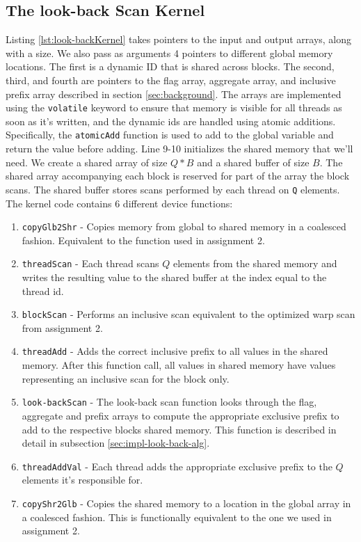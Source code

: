 \documentclass[twocolumn]{article}
\begin{document}
\subsection{The look-back Scan Kernel}
\label{sec:impl-look-back-kernel}
Listing \ref{lst:look-backKernel} takes pointers to the input and output arrays, along with a size. We also pass as arguments 4 pointers to different global memory locations. The first is a dynamic ID that is shared across blocks. The second, third, and fourth are pointers to the flag array, aggregate array, and inclusive prefix array described in section \ref{sec:background}. The arrays are implemented using the \verb|volatile| keyword to ensure that memory is visible for all threads as soon as it's written, and the dynamic ids are handled using atomic additions. Specifically, the \verb|atomicAdd| function is used to add to the global variable and return the value before adding. Line 9-10 initializes the shared memory that we'll need. We create a shared array of size $Q * B$ and a shared buffer of size $B$. The shared array accompanying each block is reserved for part of the array the block scans. The shared buffer stores scans performed by each thread on \verb|Q| elements. The kernel code contains 6 different device functions:
\begin{enumerate}[leftmargin=*]
    \itemsep0em
    \item \verb|copyGlb2Shr| - Copies memory from global to shared memory in a coalesced fashion. Equivalent to the function used in assignment 2.
    \item \verb|threadScan| - Each thread scans $Q$ elements from the shared memory and writes the resulting value to the shared buffer at the index equal to the thread id.
    \item \verb|blockScan| - Performs an inclusive scan equivalent to the optimized warp scan from assignment 2.
    \item \verb|threadAdd| - Adds the correct inclusive prefix to all values in the shared memory. After this function call, all values in shared memory have values representing an inclusive scan for the block only.
    \item \verb|look-backScan| - The look-back scan function looks through the flag, aggregate and prefix arrays to compute the appropriate exclusive prefix to add to the respective blocks shared memory. This function is described in detail in subsection \ref{sec:impl-look-back-alg}.
    \item \verb|threadAddVal| - Each thread adds the appropriate exclusive prefix to the $Q$ elements it's responsible for.
    \item \verb|copyShr2Glb| - Copies the shared memory to a location in the global array in a coalesced fashion. This is functionally equivalent to the one we used in assignment 2.
\end{enumerate}
\end{document}
